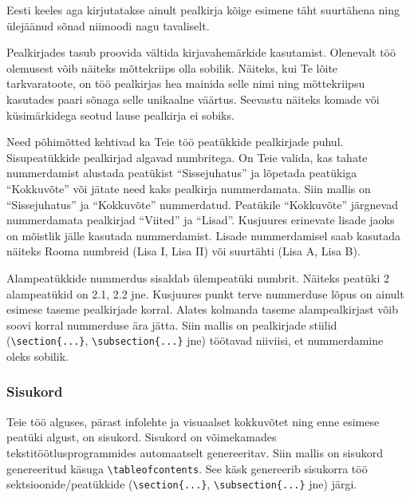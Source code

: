 Eesti keeles aga kirjutatakse ainult pealkirja kõige esimene täht suurtähena ning ülejäänud sõnad niimoodi nagu tavaliselt.

Pealkirjades tasub proovida vältida kirjavahemärkide kasutamist. Olenevalt töö olemusest võib näiteks mõttekriips olla sobilik. Näiteks, kui Te lõite tarkvaratoote, on töö pealkirjas hea mainida selle nimi ning mõttekriipsu kasutades paari sõnaga selle unikaalne väärtus. Seevastu näiteks komade või küsimärkidega seotud lause pealkirja ei sobiks.

Need põhimõtted kehtivad ka Teie töö peatükkide pealkirjade puhul. Sisupeatükkide pealkirjad algavad numbritega. On Teie valida, kas tahate nummerdamist alustada peatükist “Sissejuhatus”  ja lõpetada peatükiga “Kokkuvõte” või jätate need kaks pealkirja nummerdamata. Siin mallis on “Sissejuhatus” ja “Kokkuvõte” nummerdatud. Peatükile “Kokkuvõte” järgnevad nummerdamata pealkirjad “Viited” ja “Lisad”. Kusjuures erinevate lisade jaoks on mõistlik jälle kasutada nummerdamist. Lisade nummerdamisel saab kasutada näiteks Rooma numbreid (Lisa I, Lisa II) või suurtähti (Lisa A, Lisa B).

Alampeatükkide nummerdus sisaldab ülempeatüki numbrit. Näiteks peatüki 2 alampeatükid on 2.1, 2.2 jne. Kusjuures punkt terve nummerduse lõpus on ainult esimese taseme pealkirjade korral. Alates kolmanda taseme alampealkirjast võib soovi korral nummerduse ära jätta. Siin mallis on pealkirjade stiilid (\verb|\section{...}|, \verb|\subsection{...}| jne) töötavad niiviisi, et nummerdamine oleks sobilik.

\subsubsection{Sisukord}
Teie töö alguses, pärast infolehte ja visuaalset kokkuvõtet ning enne esimese peatüki algust, on sisukord. Sisukord on võimekamades tekstitöötlusprogrammides automaatselt genereeritav. Siin mallis on sisukord genereeritud käsuga \verb|\tableofcontents|. See käsk genereerib sisukorra töö sektsioonide/peatükkide (\verb|\section{...}|, \verb|\subsection{...}| jne) järgi.

